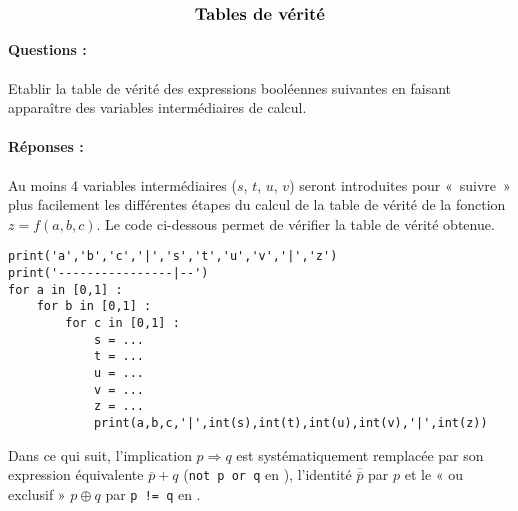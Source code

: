 \documentclass[11pt,a4paper]{article}
\begin{document}

$$\mbox{\textbf{\large Tables de vérité}}$$


\paragraph{Questions :}
Etablir la table de vérité des expressions booléennes suivantes en faisant apparaître des variables intermédiaires de calcul.

\paragraph{Réponses :} Au moins 4 variables intermédiaires 
($s$, $t$, $u$, $v$) seront introduites pour «~suivre~» plus facilement 
les différentes étapes du calcul 
de la table de vérité de la fonction $z = f(a,b,c)$. 
Le code \python{} ci-dessous permet de vérifier la table de vérité obtenue.

\begin{Verbatim}[frame=single]
print('a','b','c','|','s','t','u','v','|','z')
print('----------------|--')
for a in [0,1] :
    for b in [0,1] :
        for c in [0,1] :
            s = ...
            t = ...
            u = ...
            v = ...
            z = ...
            print(a,b,c,'|',int(s),int(t),int(u),int(v),'|',int(z))
\end{Verbatim}

Dans ce qui suit, l'implication $p \Rightarrow q$ est systématiquement remplacée 
par son expression équivalente $\overline{p} + q$ (\texttt{not p or q} en \python), 
l'identité $\overline{\overline{p}}$ par $p$ et
le « ou exclusif » $p \oplus q$ par \mbox{\texttt{p != q}} en \python{}.
\end{document}
